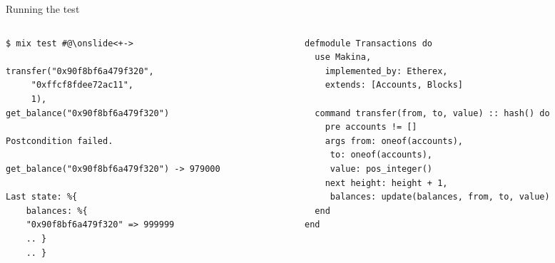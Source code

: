 \documentclass[aspectratio=169, 10pt]{beamer}
\begin{document}
\begin{frame}[label={sec:org38e2c75},fragile]{Running the test}
 \begin{columns}
\begin{column}{0.44\columnwidth}
\onslide<+->
\lstset{language=bash,label= ,caption= ,captionpos=b,numbers=none,style=shell}
\begin{lstlisting}
$ mix test #@\onslide<+->

transfer("0x90f8bf6a479f320",
	 "0xffcf8fdee72ac11",
	 1),
get_balance("0x90f8bf6a479f320")

Postcondition failed.

get_balance("0x90f8bf6a479f320") -> 979000

Last state: %{
    balances: %{
	"0x90f8bf6a479f320" => 999999
	.. }
    .. }
\end{lstlisting}
\end{column}

\begin{column}{0.52\columnwidth}
\lstset{language=elixir,label= ,caption= ,captionpos=b,numbers=none,style=display}
\begin{lstlisting}
defmodule Transactions do
  use Makina,
    implemented_by: Etherex,
    extends: [Accounts, Blocks]

  command transfer(from, to, value) :: hash() do
    pre accounts != []
    args from: oneof(accounts),
	 to: oneof(accounts),
	 value: pos_integer()
    next height: height + 1,
	 balances: update(balances, from, to, value)
  end
end
\end{lstlisting}
\end{column}
\end{columns}
\end{frame}
\end{document}
